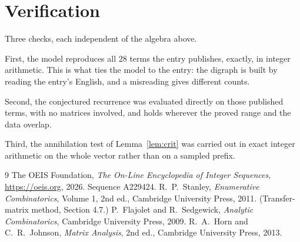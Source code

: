 \documentclass[11pt,a4paper]{article}
\theoremstyle{plain}
\theoremstyle{definition}
\begin{document}
\section{Verification}

Three checks, each independent of the algebra above.

First, the model reproduces all $28$ terms the entry publishes, exactly, in integer
arithmetic. This is what ties the model to the entry: the digraph is built by reading the
entry's English, and a misreading gives different counts.

Second, the conjectured recurrence was evaluated directly on those published terms, with no
matrices involved, and holds wherever the proved range and the data overlap.

Third, the annihilation test of Lemma~\ref{lem:crit} was carried out in exact integer
arithmetic on the whole vector rather than on a sampled prefix.

\begin{thebibliography}{9}
 The OEIS Foundation, \emph{The On-Line Encyclopedia of Integer
Sequences}, \url{https://oeis.org}, 2026. Sequence A229424.
 R.~P.~Stanley, \emph{Enumerative Combinatorics}, Volume 1, 2nd ed.,
Cambridge University Press, 2011. (Transfer-matrix method, Section 4.7.)
 P.~Flajolet and R.~Sedgewick, \emph{Analytic Combinatorics}, Cambridge
University Press, 2009.
 R.~A.~Horn and C.~R.~Johnson, \emph{Matrix Analysis}, 2nd ed., Cambridge
University Press, 2013.
\end{thebibliography}
\end{document}
